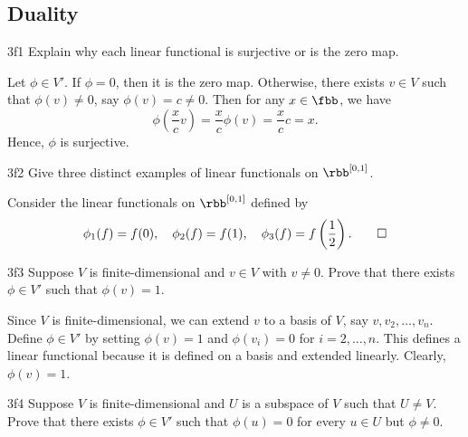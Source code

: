 \subsection{Duality}


\begin{exercise}{3f1}
    Explain why each linear functional is surjective or is the zero map.
\end{exercise}

\begin{sol}
    Let $\phi \in V'$.
	If $\phi = 0$, then it is the zero map.
	Otherwise, there exists $v \in V$ such that $\phi(v) \neq 0$, say $\phi(v) = c \neq 0$.
	Then for any $x \in \fbb$, we have
    \[
    	\phi\left(\frac{x}{c} v\right) = \frac{x}{c} \phi(v) = \frac{x}{c} c = x.
    \]
    Hence, $\phi$ is surjective.
\end{sol}

\begin{exercise}{3f2}
    Give three distinct examples of linear functionals on $\rbb^{[0, 1]}$.
\end{exercise}

\begin{sol}
    Consider the linear functionals on $\rbb^{[0, 1]}$ defined by
    \[
    	\phi_1(f) = f(0), \quad \phi_2(f) = f(1), \quad \phi_3(f) = f\left(\frac 12\right). \qedhere
    \]
\end{sol}

\begin{exercise}{3f3}
    Suppose $V$ is finite-dimensional and $v \in V$ with $v \neq 0$.
	Prove that there exists $\phi \in V'$ such that $\phi(v) = 1$.
\end{exercise}

\begin{sol}
    Since $V$ is finite-dimensional, we can extend $v$ to a basis of $V$, say $v, v_2, \ldots, v_n$.
	Define $\phi \in V'$ by setting $\phi(v) = 1$ and $\phi(v_i) = 0$ for $i = 2, \ldots, n$.
	This defines a linear functional because it is defined on a basis and extended linearly.
	Clearly, $\phi(v) = 1$.
\end{sol}

\begin{exercise}{3f4}
    Suppose $V$ is finite-dimensional and $U$ is a subspace of $V$ such that $U \neq V$.
	Prove that there exists $\phi \in V'$ such that $\phi(u) = 0$ for every $u \in U$ but $\phi \neq 0$.
\end{exercise}

